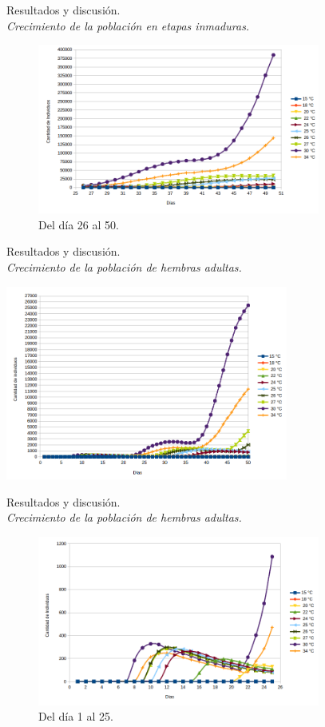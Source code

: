 \begin{frame}[t]{Resultados y discusión.\\\textit{Crecimiento de la población en etapas inmaduras.}}
\begin{center}
\begin{figure}
    \includegraphics[width=9.3cm]{./graphics/poblacion-inmadura-p2.png}
    \caption{Del día 26 al 50.}
\end{figure}
\end{center}
\end{frame}

\begin{frame}[t]{Resultados y discusión.\\\textit{Crecimiento de la población de hembras adultas.}}
\begin{center}
    \includegraphics[width=9.3cm]{./graphics/evolucion-poblacion-adultos.png}
\end{center}
\end{frame}

\begin{frame}[t]{Resultados y discusión.\\\textit{Crecimiento de la población de hembras adultas.}}
\begin{center}
\begin{figure}
    \includegraphics[width=9.3cm]{./graphics/poblacion-adulto-p1.png}
    \caption{Del día 1 al 25.}
\end{figure}
\end{center}
\end{frame}

